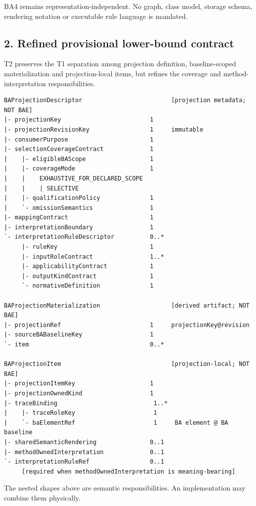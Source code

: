 \documentclass[11pt,a4paper]{article}
\begin{document}
BA4 remains representation-independent. No graph, class model, storage
schema, rendering notation or executable rule language is mandated.

\subsection{2. Refined provisional lower-bound
contract}\label{2-refined-provisional-lower-bound-contract}

T2 preserves the T1 separation among projection definition,
baseline-scoped materialization and projection-local items, but refines
the coverage and method-interpretation responsibilities.

\begin{verbatim}
BAProjectionDescriptor                         [projection metadata; NOT BAE]
|- projectionKey                         1
|- projectionRevisionKey                 1     immutable
|- consumerPurpose                       1
|- selectionCoverageContract             1
|    |- eligibleBAScope                  1
|    |- coverageMode                     1
|    |    EXHAUSTIVE_FOR_DECLARED_SCOPE
|    |    | SELECTIVE
|    |- qualificationPolicy              1
|    `- omissionSemantics                1
|- mappingContract                       1
|- interpretationBoundary                1
`- interpretationRuleDescriptor          0..*
     |- ruleKey                          1
     |- inputRoleContract                1..*
     |- applicabilityContract            1
     |- outputKindContract               1
     `- normativeDefinition              1

BAProjectionMaterialization                    [derived artifact; NOT BAE]
|- projectionRef                         1     projectionKey@revision
|- sourceBABaselineKey                   1
`- item                                  0..*

BAProjectionItem                               [projection-local; NOT BAE]
|- projectionItemKey                     1
|- projectionOwnedKind                   1
|- traceBinding                           1..*
|    |- traceRoleKey                      1
|    `- baElementRef                      1     BA element @ BA baseline
|- sharedSemanticRendering               0..1
|- methodOwnedInterpretation             0..1
`- interpretationRuleRef                 0..1
     [required when methodOwnedInterpretation is meaning-bearing]
\end{verbatim}

The nested shapes above are semantic responsibilities. An implementation
may combine them physically.
\end{document}
